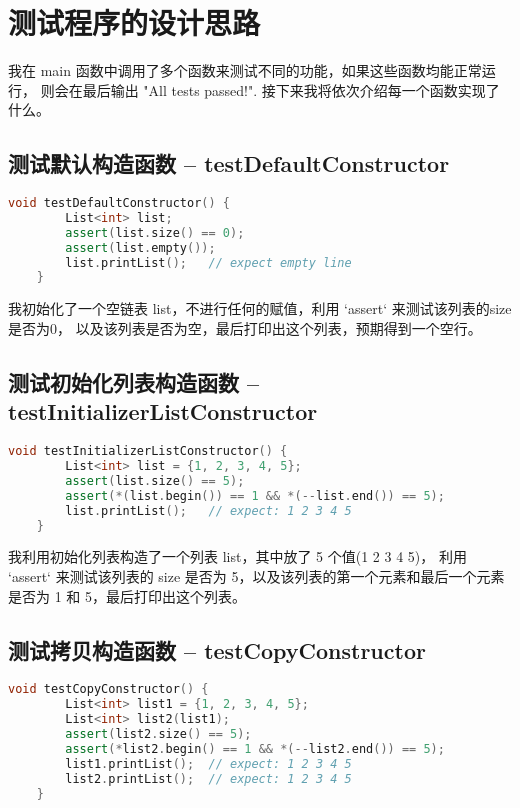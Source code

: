 \documentclass[UTF8]{ctexart}
\begin{document}
\pagestyle{fancy}
\fancyhead{}

\section{测试程序的设计思路}
我在 main 函数中调用了多个函数来测试不同的功能，如果这些函数均能正常运行，
则会在最后输出 "All tests passed!". 接下来我将依次介绍每一个函数实现了什么。

\subsection{测试默认构造函数 -- testDefaultConstructor}
\begin{lstlisting}[language=c++, breaklines=true, keywordstyle=\color{blue!70}, commentstyle=\color{red!50!green!50!blue!50}, frame=shadowbox, rulesepcolor=\color{red!20!green!20!blue!20}]
    void testDefaultConstructor() {
        List<int> list;
        assert(list.size() == 0);
        assert(list.empty());
        list.printList();   // expect empty line
    }
\end{lstlisting}

我初始化了一个空链表 list，不进行任何的赋值，利用 `assert` 来测试该列表的size是否为0，
以及该列表是否为空，最后打印出这个列表，预期得到一个空行。

\subsection{测试初始化列表构造函数 -- testInitializerListConstructor}
\begin{lstlisting}[language=c++, breaklines=true, keywordstyle=\color{blue!70}, commentstyle=\color{red!50!green!50!blue!50}, frame=shadowbox, rulesepcolor=\color{red!20!green!20!blue!20}]
    void testInitializerListConstructor() {
        List<int> list = {1, 2, 3, 4, 5};
        assert(list.size() == 5);
        assert(*(list.begin()) == 1 && *(--list.end()) == 5);
        list.printList();   // expect: 1 2 3 4 5
    }
\end{lstlisting}

我利用初始化列表构造了一个列表 list，其中放了 5 个值(1 2 3 4 5)，
利用 `assert` 来测试该列表的 size 是否为 5，以及该列表的第一个元素和最后一个元素是否为 1 和 5，最后打印出这个列表。

\subsection{测试拷贝构造函数 -- testCopyConstructor}
\begin{lstlisting}[language=c++, breaklines=true, keywordstyle=\color{blue!70}, commentstyle=\color{red!50!green!50!blue!50}, frame=shadowbox, rulesepcolor=\color{red!20!green!20!blue!20}]
    void testCopyConstructor() {
        List<int> list1 = {1, 2, 3, 4, 5};
        List<int> list2(list1);
        assert(list2.size() == 5);
        assert(*list2.begin() == 1 && *(--list2.end()) == 5);
        list1.printList();  // expect: 1 2 3 4 5
        list2.printList();  // expect: 1 2 3 4 5
    }
\end{lstlisting}
\end{document}
